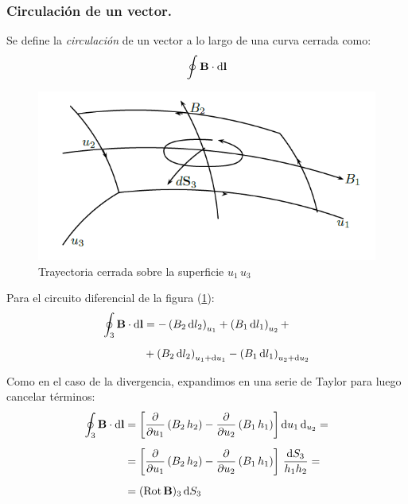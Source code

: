\documentclass[12pt]{article}
\numberwithin{equation}{section}
\begin{document}
\subsubsection{Circulación de un vector.}

Se define la \emph{circulación} de un vector a lo largo de una curva cerrada como:
\begin{align*}
\oint \vb{B} \cdot \dd{\vb{l}}
\end{align*}

\begin{figure}[H]
    \centering
    \includegraphics[scale=0.75]{Imagenes/Circulacion_Vector.png}
    \caption{Trayectoria cerrada sobre la superficie $u_{1} \, u_{3}$}
    \label{fig:figura_trayectoria_cerrada}
\end{figure}

Para el circuito diferencial de la figura (\ref{fig:figura_trayectoria_cerrada}):
\begin{align*}
\oint_{3} \vb{B} \cdot \dd{\vb{l}} &= - \left( B_{2} \dd{l_{2}} \right)_{u_{1}} + \left( B_{1} \dd{l_{1}} \right)_{u_{2}} + \\[0.5em]
&+ \left( B_{2} \dd{l_{2}} \right)_{u_{1}+\dd{u_{1}}} - \left( B_{1} \dd{l_{1}} \right)_{u_{2}+\dd{u_{2}}}
\end{align*}

Como en el caso de la divergencia, expandimos en una serie de Taylor para luego cancelar términos:
\begin{align*}
\oint_{3} \vb{B} \cdot \dd{\vb{l}} &= \left[ \displaystyle \pdv{u_{1}} \left( B_{2} \, h_{2}\right) - \pdv{u_{2}} \left( B_{1} \, h_{1} \right) \right] \dd{u_{1}} \dd_{u_{2}} = \\[0.5em] 
&= \left[ \pdv{u_{1}} \left( B_{2} \, h_{2}\right) - \pdv{u_{2}} \left( B_{1} \, h_{1} \right) \right] \, \dfrac{\dd{S_{3}}}{h_{1} h_{2}} = \\[0.5em] 
&= ({\rm{Rot}} \, \vb{B})_{3} \dd{S_{3}}
\end{align*}
\end{document}
